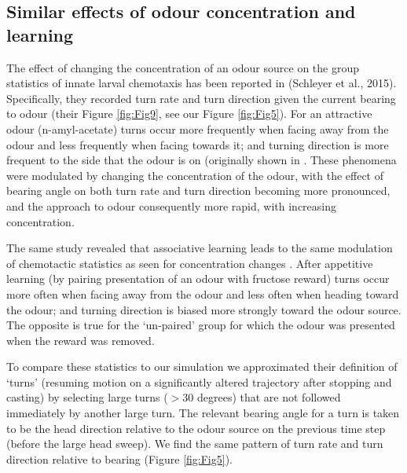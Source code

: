 \documentclass[10pt,a4paper]{article}
\begin{document}




\subsection{Similar effects of odour concentration and learning}
The effect of changing the concentration of an odour source on the group statistics of innate larval chemotaxis has been reported in (Schleyer et al., 2015). Specifically, they recorded turn rate and turn direction given the current bearing to odour (their Figure \ref{fig:Fig9}, see our Figure \ref{fig:Fig5}). For an attractive odour (n-amyl-acetate) turns occur more frequently when facing away from the odour and less frequently when facing towards it; and turning direction is more frequent to the side that the odour is on (originally shown in \citet{gomez2011active}. These phenomena were modulated by changing the concentration of the odour, with the effect of bearing angle on both turn rate and turn direction becoming more pronounced, and the approach to odour consequently more rapid, with increasing concentration.

The same \cite{schleyer2015learning} study revealed that associative learning leads to the same modulation of chemotactic statistics as seen for concentration changes \citep[][Figure 5]{schleyer2015learning}. After appetitive learning (by pairing presentation of an odour with fructose reward) turns occur more often when facing away from the odour and less often when heading toward the odour; and turning direction is biased more strongly toward the odour source. The opposite is true for the ‘un-paired’ group for which the odour was presented when the reward was removed. 


 To compare these statistics to our simulation we approximated their definition of ‘turns’ (resuming motion on a significantly altered trajectory after stopping and casting) by selecting large turns ($>30$ degrees) that are not followed immediately by another large turn. The relevant bearing angle for a turn is taken to be the head direction relative to the odour source on the previous time step (before the large head sweep). We find the same pattern of turn rate and turn direction relative to bearing (Figure \ref{fig:Fig5}).
\end{document}
